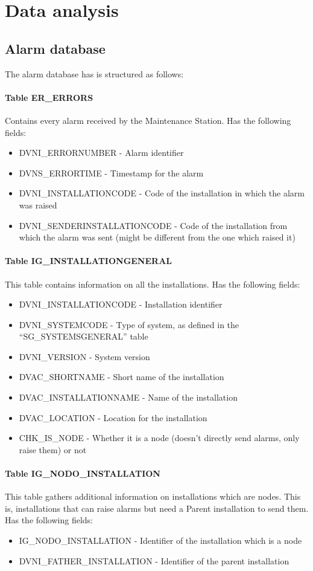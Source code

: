 \documentclass[a4paper,10pt]{report}
\begin{document}
\chapter{Data analysis}
\section{Alarm database}
The alarm database has is structured as follows:
\subsubsection*{Table ER\_ERRORS}
Contains every alarm received by the Maintenance Station. Has the following fields:
\begin{itemize}
 \item DVNI\_ERRORNUMBER - Alarm identifier
 \item DVNS\_ERRORTIME - Timestamp for the alarm
 \item DVNI\_INSTALLATIONCODE - Code of the installation in which the alarm was raised
 \item DVNI\_SENDERINSTALLATIONCODE - Code of the installation from which the alarm was sent (might be different from the one which raised it)
\end{itemize}

\subsubsection*{Table IG\_INSTALLATIONGENERAL}
This table contains information on all the installations. Has the following fields:
\begin{itemize}
 \item DVNI\_INSTALLATIONCODE - Installation identifier
 \item DVNI\_SYSTEMCODE - Type of system, as defined in the ``SG\_SYSTEMSGENERAL'' table
 \item DVNI\_VERSION - System version
 \item DVAC\_SHORTNAME - Short name of the installation
 \item DVAC\_INSTALLATIONNAME - Name of the installation
 \item DVAC\_LOCATION - Location for the installation
 \item CHK\_IS\_NODE - Whether it is a node (doesn't directly send alarms, only raise them) or not
\end{itemize}

\subsubsection*{Table IG\_NODO\_INSTALLATION}
This table gathers additional information on installations which are nodes. This is, installations that can raise alarms but need a Parent installation to send them. Has the following fields:
\begin{itemize}
 \item IG\_NODO\_INSTALLATION - Identifier of the installation which is a node
 \item DVNI\_FATHER\_INSTALLATION - Identifier of the parent installation
\end{itemize}
\end{document}
